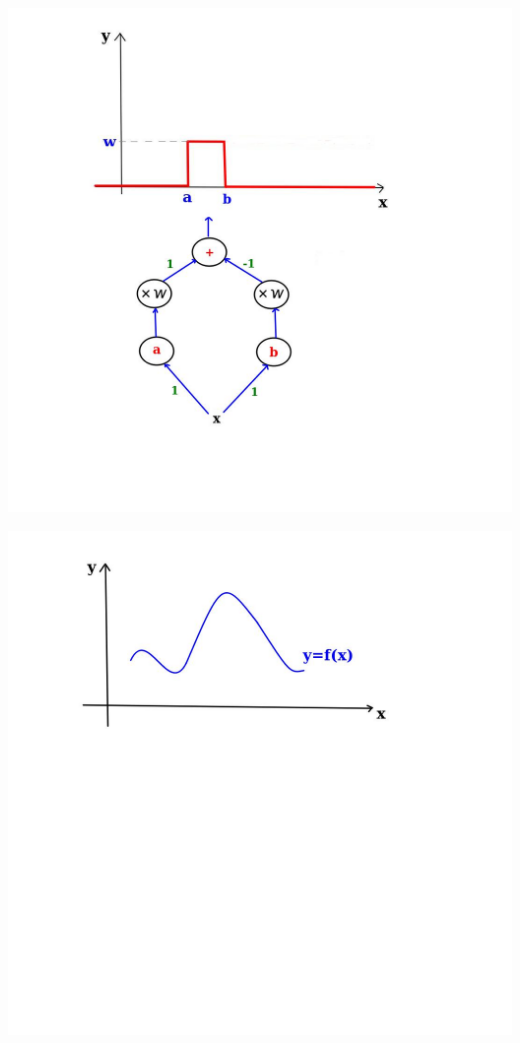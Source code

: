 \documentclass[12pt,aspectratio=169]{beamer}
\begin{document}
\begin{frame}
\begin{center}
\includegraphics[scale=0.3]{step2}
\end{center}
\end{frame}


\begin{frame}
\begin{center}
\includegraphics[scale=0.4]{real}
\end{center}
\end{frame}
\end{document}
